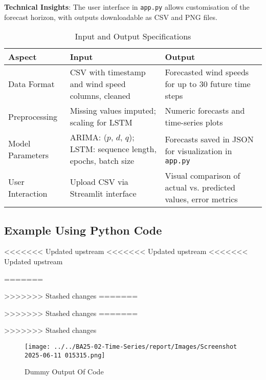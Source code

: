 \textbf{Technical Insights}: The user interface in \texttt{app.py} allows customisation of the forecast horizon, with outputs downloadable as CSV and PNG files.



\begin{table}[h!]
	\centering
	\caption{Input and Output Specifications}
	\begin{tabular}{|p{4cm}|p{5cm}|p{5cm}|}
		\hline
		\textbf{Aspect} & \textbf{Input} & \textbf{Output} \\
		\hline
		Data Format & CSV with timestamp and wind speed columns, cleaned & Forecasted wind speeds for up to 30 future time steps \\
		\hline
		Preprocessing & Missing values imputed; scaling for LSTM & Numeric forecasts and time-series plots \\
		\hline
		Model Parameters & ARIMA: ($p$, $d$, $q$); LSTM: sequence length, epochs, batch size & Forecasts saved in JSON for visualization in \texttt{app.py} \\
		\hline
		User Interaction & Upload CSV via Streamlit interface & Visual comparison of actual vs. predicted values, error metrics \\
		\hline
	\end{tabular}
\end{table}
\subsection{Example Using Python Code}
<<<<<<< Updated upstream
<<<<<<< Updated upstream
<<<<<<< Updated upstream

=======

>>>>>>> Stashed changes
=======

>>>>>>> Stashed changes
=======

>>>>>>> Stashed changes
\begin{figure}[htbp]
	\centering
	\texttt{[image: ../../BA25-02-Time-Series/report/Images/Screenshot 2025-06-11 015315.png]}
	\caption{Dummy Output Of Code}
	\label{fig:dummy_output}
\end{figure}

